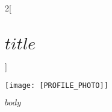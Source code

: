 \documentclass[12pt]{report}
\begin{document}
\begin{multicols}{2}[\section*{\textcolor{gblue}{$title$}}]

\texttt{[image: [PROFILE\_PHOTO]]}

$body$

\end{multicols}
\rfoot{}
\end{document}
